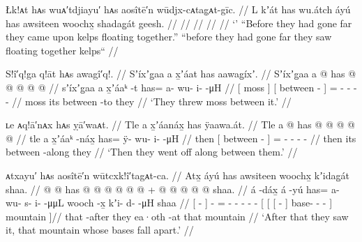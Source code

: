 \ex\label{ex:92-103-}%
%
\begingl
	\glpreamble	Łk!ᴀt hᴀs wuᴀ′tdjiayu′ hᴀs aosîtē′n wūdjx-cᴀtag̣ᴀt-gīc. //
	\glpreamble	L kʼát has wu.átch áyú has awsiteen woochx̱ shadag̱át geesh. //
	\gla	 //
	\glb	 //
	\glc	 //
	\gld	 //
	\glft	‘’\newline
		“Before they had gone far they came upon kelps floating together.”\newline
		“before they had gone far they saw floating together kelps“
		//
\endgl
\xe

\ex\label{ex:92-104-throw-moss-between}%
%
\begingl
	\glpreamble	S!î′q!ga q!āt hᴀs awagî′q!. //
	\glpreamble	Sʼíxʼg̱aa a x̱ʼáat has aawag̱íxʼ. //
	\gla	{} Sʼíxʼg̱aa {} {} a  @ {} {}
		has @  @ {} @ {} @ {} @ {} //
	\glb	{} sʼíxʼg̱aa {} {} a x̱ʼáaᵏ -t {}
		has= a- wu- i-  -μH //
	\glc	{}[ moss {}] {}[  between - {}]
		= - - -  - //
	\gld	{} moss {} {} its between -to {}
		they  {} {} {} {} //
	\glft	‘They threw moss between it.’
		//
\endgl
\xe

\ex\label{ex:92-105-went-along-it}%
%
\begingl
	\glpreamble	ʟe ᴀq!ā′nᴀx hᴀs ỵā′waᴀt. //
	\glpreamble	Tle a x̱ʼáanáx̱ has ÿaawa.át. //
	\gla	Tle {} a  @ {} {}
		has @  @ {} @ {} @ {} @ {} //
	\glb	tle {} a x̱ʼáaᵏ -náx̱ {}
		has= ÿ- wu- i-  -μH //
	\glc	then {}[  between - {}]
		= - - -  - //
	\gld	then {} its between -along {}
		they  {} {} {} {} //
	\glft	‘Then they went off along between them.’
		//
\endgl
\xe

\ex\label{ex:92-106-saw-mountain-fall-apart}%
%
\begingl
	\glpreamble	ᴀtxayu′ hᴀs aosîtē′n wūtcxk!î′tagᴀt-ca. //
	\glpreamble	Atx̱ áyú has awsiteen woochx̱ kʼidag̱át shaa. //
	\gla	{}  @ {} {}  @ {}
		has @  @ {} @ {} @ {} @ {} @ {} +
		{} {} {}  @ {} {}
			 @ {} @ {} @ {} @ {} {} shaa. {} //
	\glb	{} á -dáx̱ {} á -yú
		has= a- wu- s- i-  -μμL
		{} {} {} wooch -x̱ {}
			kʼi- d-  -μH {} {} shaa {} //
	\glc	{}[  - {}]  -
		= - - - -  -
		{}[ {}[ {}[  - {}]
			base- -  - \· {}]
			mountain {}]//
	\gld	{} that -after {}  {}
		they  {} {} {} {} {}
		{} {} {} ea·oth -at {}
			 {} {} {} \·that {} mountain {} //
	\glft	‘After that they saw it, that mountain whose bases fall apart.’
		//
\endgl
\xe

